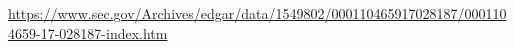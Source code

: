 \url{https://www.sec.gov/Archives/edgar/data/1549802/000110465917028187/0001104659-17-028187-index.htm}

 
\newpage


%
%
%


